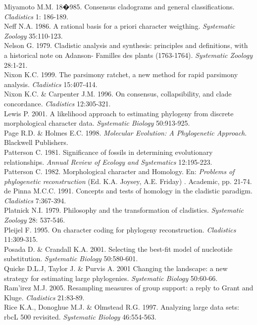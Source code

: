 Miyamoto M.M. 18�985. Consensus cladograms and general classifications. \textit{Cladistics} 1: 186-189.\\
Neff N.A. 1986. A rational basis for a priori character weigthing. \textit{Systematic Zoology} 35:110-123.\\
Nelson G. 1979. Cladistic analysis and synthesis: principles and definitions, with a historical note on Adanson- Familles des plants (1763-1764). \textit{Systematic Zoology} 28:1-21.\\
Nixon K.C. 1999. The parsimony ratchet, a new method for rapid parsimony analysis. \textit{Cladistics} 15:407-414.\\
Nixon K.C. \& Carpenter J.M. 1996. On consensus, collapsibility, and clade concordance. \textit{Cladistics} 12:305-321.\\
Lewis P. 2001. A likelihood approach to estimating phylogeny from discrete morphological character data. \textit{Systematic Biology} 50:913-925.\\
Page R.D. \& Holmes E.C. 1998. \textit{Molecular Evolution: A Phylogenetic Approach}. Blackwell Publishers.\\
Patterson C. 1981. Significance of fossils in determining evolutionary relationships. \textit{Annual Review of Ecology and Systematics} 12:195-223.\\
Patterson C. 1982. Morphological character and Homology. En: \textit{Problems of phylogenetic reconstruction} (Ed. K.A. Joysey, A.E. Friday) . Academic, pp. 21-74.\\
de Pinna M.C.C. 1991. Concepts and tests of homology in the cladistic paradigm. \textit{Cladistics} 7:367-394.\\
Platnick N.I. 1979. Philosophy and the transformation of cladistics. \textit{Systematic Zoology} 28: 537-546.\\
Pleijel F. 1995. On character coding for phylogeny reconstruction. \textit{Cladistics} 11:309-315.\\
Posada D. \& Crandall K.A. 2001. Selecting the best-fit model of nucleotide substitution. \textit{Systematic Biology} 50:580-601.\\
Quicke D.L.J, Taylor J. \& Purvis A. 2001 Changing the landscape: a new strategy for estimating large phylogenies. \textit{Systematic Biology} 50:60-66.\\
Ram'irez M.J. 2005. Resampling measures of group support: a reply to Grant and Kluge. \textit{Cladistics} 21:83-89.\\
Rice K.A., Donoghue M.J. \& Olmstead R.G. 1997. Analyzing large data sets: rbcL 500 revisited. \textit{Systematic Biology} 46:554-563.\\
